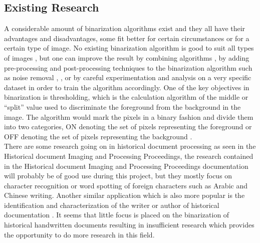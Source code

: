\documentclass[11pt]{article}
\begin{document}
    \subsection{Existing Research}
    		A considerable amount of binarization algorithms exist and they all have their advantages and disadvantages, some fit better for certain circumstances or for a certain type of image. No existing binarization algorithm is good to suit all types of images \cite{lins2015binarizing}, but one can improve the result by combining algorithms \cite{ntogas2008binarization}, by adding pre-processing and post-processing techniques to the binarization algorithm such as noise removal \cite{agrawal2011stroke}, \cite{lins2015binarizing}, or by careful experimentation and analysis on a very specific dataset in order to train the algorithm accordingly. One of the key objectives in binarization is thresholding, which is the calculation algorithm of the middle or ``split'' value used to discriminate the foreground from the background in the image. The algorithm would mark the pixels in a binary fashion and divide them into two categories, ON denoting the set of pixels representing the foreground or OFF denoting the set of pixels representing the background \cite{o1995document}.\\

    		There are some research going on in historical document processing as seen in the Historical document Imaging and Processing Proceedings, the research contained in the Historical document Imaging and Processing Proceedings documentation will probably be of good use during this project, but they mostly focus on character recognition or word spotting of foreign characters such as Arabic and Chinese writing. Another similar  application which is also more popular is the identification and characterization of the writer or author of historical documentation \cite{ogier2006madonne}. It seems that little focus is placed on the binarization of historical handwritten documents resulting in insufficient research \cite{jacob2014survey} which provides the opportunity to do more research in this field.\\

    		\newpage
\end{document}
